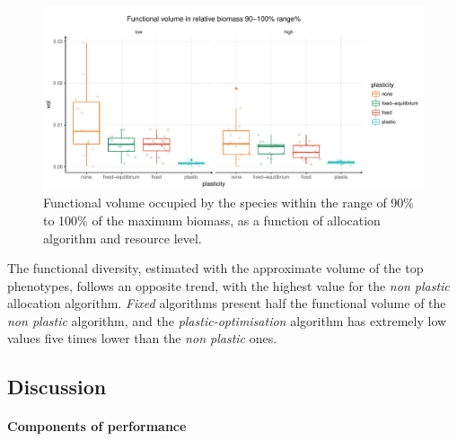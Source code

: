 \begin{figure}\label{fig:function_div}
\includegraphics[width = \textwidth]{./2_PP/Figures/Landscape/plot_fdiv.pdf}
\caption{Functional volume occupied by the species within the range of 90\% to 100\% of the maximum biomass, as a function of allocation algorithm and resource level.}
\end{figure}

The functional diversity, estimated with the approximate volume of the top phenotypes, follows an opposite trend, with the highest value for the \textit{non plastic} allocation algorithm. \textit{Fixed} algorithms present half the functional volume of the \textit{non plastic} algorithm, and the \textit{plastic-optimisation} algorithm has extremely low values five times lower than the \textit{non plastic} ones.



\subsection{Discussion}

\paragraph{Components of performance}

